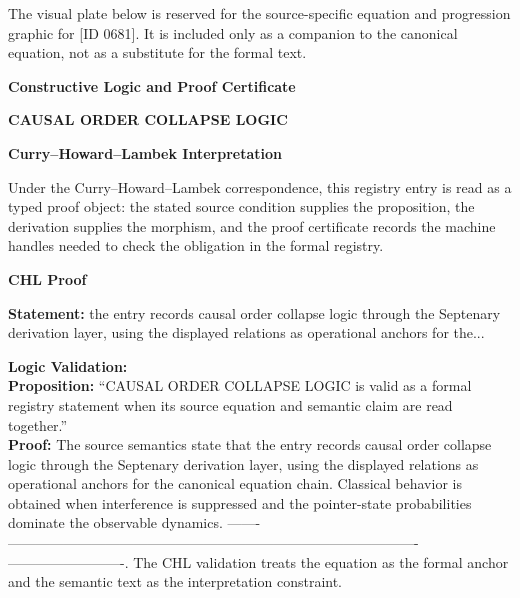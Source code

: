 \begingroup\footnotesize\sloppy
The visual plate below is reserved for the source-specific equation and progression graphic for [ID 0681]. It is included only as a companion to the canonical equation, not as a substitute for the formal text.
\par\endgroup
\ifTZPDarkEdition
{}
\fi

\clearpage
\begingroup\tzpsupportsetup
\noindent\textbf{\fontsize{10.8pt}{12.8pt}\selectfont [ID 0681] Constructive Logic and Proof Certificate}\par
\noindent\textbf{\fontsize{10pt}{12pt}\selectfont CAUSAL ORDER COLLAPSE LOGIC}\par
\vspace{0.45em}
\begingroup
\footnotesize
\setlength{\parskip}{0.22em}
\setlength{\parindent}{0pt}
\noindent\textbf{Curry--Howard--Lambek Interpretation}\par
Under the Curry--Howard--Lambek correspondence, this registry entry is read as a typed proof
object: the stated source condition supplies the proposition, the derivation supplies the
morphism, and the proof certificate records the machine handles needed to check the obligation
in the formal registry.

\vspace{0.45em}
\noindent\textbf{CHL Proof}\par
\textbf{Statement:} the entry records causal order collapse logic through the Septenary derivation layer,
using the displayed relations as operational anchors for the...

\textbf{Logic Validation:}\\
\textbf{Proposition:} ``CAUSAL ORDER COLLAPSE LOGIC is valid as a formal registry statement when its source
equation and semantic claim are read together.''\\
\textbf{Proof:} The source semantics state that the entry records causal order collapse logic through
the Septenary derivation layer, using the displayed relations as operational anchors for
the canonical equation chain. Classical behavior is obtained when interference is
suppressed and the pointer-state probabilities dominate the observable dynamics. -------
----------------------------------------------------------------------------------------
-------------------------. The CHL validation treats the equation as the formal anchor
and the semantic text as the interpretation constraint.

